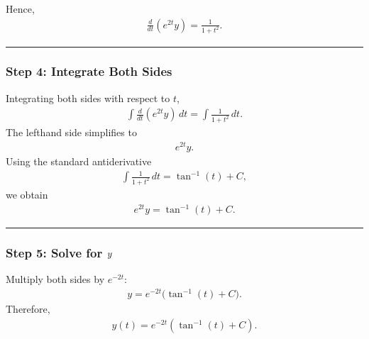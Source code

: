 \documentclass[letterpaper,10pt,english]{sphinxmanual}
\begin{document}
\sphinxAtStartPar
Hence,
\begin{equation*}
\begin{split}\frac{d}{dt}(e^{2t}y)
=
\frac{1}{1+t^2}.\end{split}
\end{equation*}

\bigskip\hrule\bigskip



\subsubsection{Step 4: Integrate Both Sides}
\label{\detokenize{Language/Science_language/ODE_calculus/course_MATH_3035/homework_assignments/index_pdf:step-4-integrate-both-sides}}
\sphinxAtStartPar
Integrating both sides with respect to \(t\),
\begin{equation*}
\begin{split}\int \frac{d}{dt}(e^{2t}y)\,dt
=
\int \frac{1}{1+t^2}\,dt.\end{split}
\end{equation*}
\sphinxAtStartPar
The left\sphinxhyphen{}hand side simplifies to
\begin{equation*}
\begin{split}e^{2t}y.\end{split}
\end{equation*}
\sphinxAtStartPar
Using the standard antiderivative
\begin{equation*}
\begin{split}\int \frac{1}{1+t^2}\,dt
=
\tan^{-1}(t)+C,\end{split}
\end{equation*}
\sphinxAtStartPar
we obtain
\begin{equation*}
\begin{split}e^{2t}y
=
\tan^{-1}(t)+C.\end{split}
\end{equation*}

\bigskip\hrule\bigskip



\subsubsection{Step 5: Solve for \protect\(y\protect\)}
\label{\detokenize{Language/Science_language/ODE_calculus/course_MATH_3035/homework_assignments/index_pdf:step-5-solve-for-y}}
\sphinxAtStartPar
Multiply both sides by \(e^{-2t}\):
\begin{equation*}
\begin{split}y
=
e^{-2t}\bigl(\tan^{-1}(t)+C\bigr).\end{split}
\end{equation*}
\sphinxAtStartPar
Therefore,
\begin{equation*}
\begin{split}\boxed{
y(t)
=
e^{-2t}\left(\tan^{-1}(t)+C\right)
}.\end{split}
\end{equation*}
\end{document}
